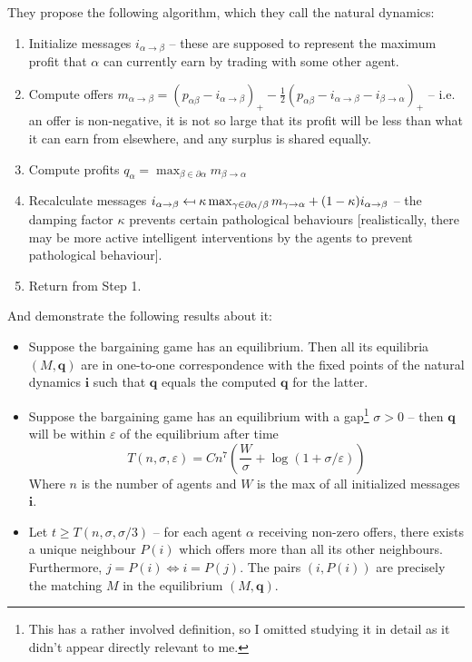 \documentclass{article}
\begin{document}
They propose the following algorithm, which they call the natural dynamics:

\begin{enumerate}
    \item Initialize messages $i_{\alpha\to\beta}$  -- these are supposed to represent the maximum profit that $\alpha$ can currently earn by trading with some other agent. 
    \item Compute offers $m_{\alpha\to\beta}=(p_{\alpha\beta}-i_{\alpha\to\beta})_+-\frac12(p_{\alpha\beta}-i_{\alpha\to\beta}-i_{\beta\to\alpha})_+$ -- i.e. an offer is non-negative, it is not so large that its profit will be less than what it can earn from elsewhere, and any surplus is shared equally.
    \item Compute profits $q_\alpha=\max_{\beta\in\partial\alpha}m_{\beta\to\alpha}$
    \item Recalculate messages $i_{\alpha\to\beta}\mapsfrom\kappa\max_{\gamma\in\partial\alpha/\beta}m_{\gamma\to\alpha}+(1-\kappa)i_{\alpha\to\beta}$ -- the damping factor $\kappa$ prevents certain pathological behaviours [realistically, there may be more active intelligent interventions by the agents to prevent pathological behaviour].
    \item Return from Step 1.
\end{enumerate}

And demonstrate the following results about it:

\begin{itemize}
    \item Suppose the bargaining game has an equilibrium. Then all its equilibria $(M,\bm{q})$ are in one-to-one correspondence with the fixed points of the natural dynamics $\bm{i}$ such that $\bm{q}$ equals the computed $\bm{q}$ for the latter.
    \item Suppose the bargaining game has an equilibrium with a gap\footnote{This has a rather involved definition, so I omitted studying it in detail as it didn't appear directly relevant to me.} $\sigma>0$ -- then $\bm{q}$ will be within $\varepsilon$ of the equilibrium after time
    $$T(n,\sigma,\varepsilon)=Cn^7\left(\frac{W}{\sigma}+\log(1+\sigma/\varepsilon)\right)$$
    Where $n$ is the number of agents and $W$ is the max of all initialized messages $\bm{i}$.
    \item Let $t\ge T(n,\sigma,\sigma/3)$ -- for each agent $\alpha$ receiving non-zero offers, there exists a unique neighbour $P(i)$ which offers more than all its other neighbours. Furthermore, $j=P(i)\iff i=P(j)$. The pairs $(i, P(i))$ are precisely the matching $M$ in the equilibrium $(M,\bm{q})$.
\end{itemize}
\end{document}
